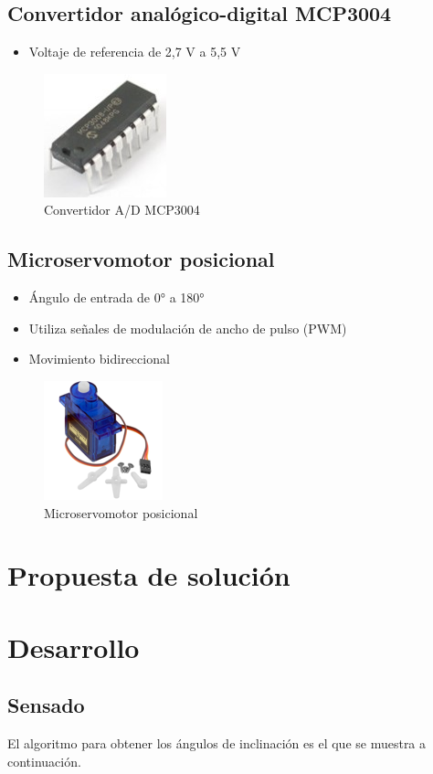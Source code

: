 \documentclass[12pt]{report}
\begin{document}
\subsection*{Convertidor analógico-digital MCP3004}
\begin{itemize}
	
	\item Voltaje de referencia de 2,7 V a 5,5 V
	
\end{itemize}

\begin{figure}[htb]
	\centering
	\includegraphics[scale=0.6]{mcp3004.jpg}
	\caption{Convertidor A/D MCP3004}
\end{figure}

\subsection*{Microservomotor posicional}
\begin{itemize}
	
	\item Ángulo de entrada de 0° a 180°
	
	\item Utiliza señales de modulación de ancho de pulso (PWM)
	
	\item Movimiento bidireccional
	
\end{itemize}

\begin{figure}[htb]
	\centering
	\includegraphics[scale=0.6]{servomotor.png}
	\caption{Microservomotor posicional}
\end{figure}

\newpage
\section*{Propuesta de solución}

\newpage
\section*{Desarrollo}

\subsection*{Sensado}
El algoritmo para obtener los ángulos de inclinación es el que se muestra a continuación.

\end{document}
